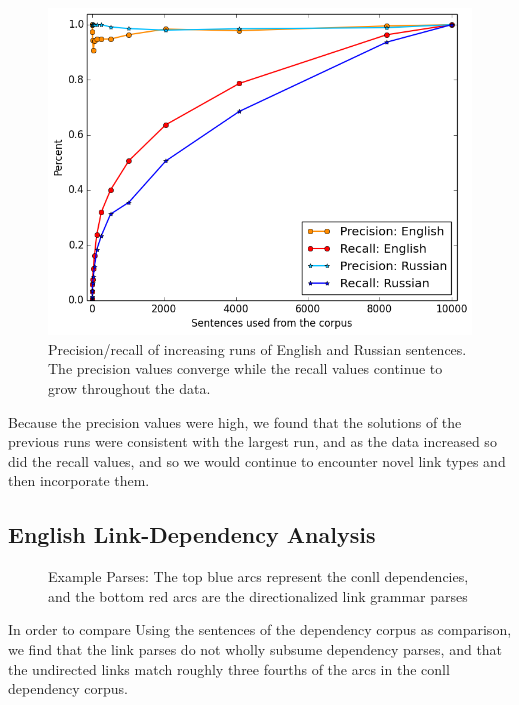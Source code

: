 \documentclass[11pt]{article}
\begin{document}
\begin{figure}[ht!]
  \small
  \centering
  \includegraphics[width=\linewidth, keepaspectratio=true]{figure/precision_recall.png}
  \caption{\small Precision/recall of increasing runs of English and Russian sentences. The precision values converge while the recall values continue to grow throughout the data.}
\end{figure}
Because the precision values were high, we found that the solutions of the previous runs were consistent with the largest run, and as the data increased so did the recall values, and so we would continue to encounter novel link types and then incorporate them.


\subsection{English Link-Dependency Analysis}

\begin{figure}[ht!]
  \centering
  
  \caption{Example Parses: The top blue arcs represent the conll dependencies, and the bottom red arcs are the directionalized link grammar parses}
  \label{fig:parses}
\end{figure}

In order to compare 
Using the sentences of the dependency corpus as comparison, we find that the link parses do not wholly subsume dependency parses, and that the undirected links match roughly three fourths of the arcs in the conll dependency corpus.  
\end{document}

